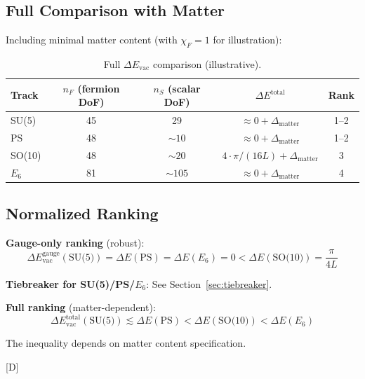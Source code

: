 \documentclass[11pt,a4paper]{article}
\newcommand{\tagD}{\textcolor{blue!70!black}{[D]}}
\begin{document}
\subsection{Full Comparison with Matter}

Including minimal matter content (with $\chi_F = 1$ for illustration):

\begin{table}[h]
\centering
\begin{tabular}{lcccc}
\toprule
Track & $n_F$ (fermion DoF) & $n_S$ (scalar DoF) & $\Delta E^{\text{total}}$ & Rank \\
\midrule
SU(5) & 45 & 29 & $\approx 0 + \Delta_{\text{matter}}$ & 1--2 \\
PS & 48 & $\sim 10$ & $\approx 0 + \Delta_{\text{matter}}$ & 1--2 \\
SO(10) & 48 & $\sim 20$ & $4 \cdot \pi/(16L) + \Delta_{\text{matter}}$ & 3 \\
$E_6$ & 81 & $\sim 105$ & $\approx 0 + \Delta_{\text{matter}}$ & 4 \\
\bottomrule
\end{tabular}
\caption{Full $\Delta E_{\text{vac}}$ comparison (illustrative).}
\label{tab:full-ranking}
\end{table}

\subsection{Normalized Ranking}

\begin{resultbox}
\textbf{Gauge-only ranking} (robust):
\begin{equation}
\label{eq:gauge-ranking}
\boxed{\Delta E_{\text{vac}}^{\text{gauge}}(\text{SU(5)}) = \Delta E(\text{PS}) = \Delta E(E_6) = 0
< \Delta E(\text{SO(10)}) = \frac{\pi}{4L}}
\end{equation}

\textbf{Tiebreaker for SU(5)/PS/$E_6$}: See Section~\ref{sec:tiebreaker}.

\textbf{Full ranking} (matter-dependent):
\begin{equation}
\label{eq:full-ranking}
\Delta E_{\text{vac}}^{\text{total}}(\text{SU(5)}) \lesssim \Delta E(\text{PS})
< \Delta E(\text{SO(10)}) < \Delta E(E_6)
\end{equation}

The inequality depends on matter content specification.

\tagD
\end{resultbox}
\end{document}
